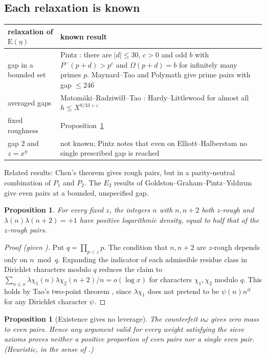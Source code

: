 \documentclass[11pt]{amsart}
\newtheorem{proposition}[theorem]{Proposition}
\theoremstyle{definition}
\theoremstyle{remark}
\newcommand{\EE}{\mathrm E}
\begin{document}
\subsection{Each relaxation is known}
\begin{table}[h]
\centering\small
\begin{tabular}{p{4.2cm}p{8.6cm}}
\toprule
relaxation of $\EE(\eta)$ & known result\\
\midrule
gap in a bounded set & Pintz \cite[Thm.~2]{Pin10}: there are $|d|\le30$, $c>0$ and odd $b$ with $P^-(p+d)>p^c$ and $\Omega(p+d)=b$ for infinitely many primes $p$. Maynard--Tao and Polymath \cite{Polymath8b} give prime pairs with gap $\le246$\\
averaged gaps & Matom\"aki--Radziwi\l{}\l{}--Tao \cite{MRT19}: Hardy--Littlewood for almost all $h\le X^{8/33+\varepsilon}$\\
fixed roughness & Proposition~\ref{prop:fixedz}\\
gap $2$ and $z=x^\eta$ & not known; Pintz notes that even on Elliott--Halberstam no single prescribed gap is reached \cite[p.~3]{Pin10}\\
\bottomrule
\end{tabular}
\end{table}

Related results: Chen's theorem \cite{Che73} gives rough pairs, but in a parity-neutral combination of $P_1$ and $P_2$. The $E_2$ results of Goldston--Graham--Pintz--Y{\i}ld{\i}r{\i}m \cite{GGPY06} give even pairs at a bounded, unspecified gap.

\begin{proposition}\label{prop:fixedz}
For every fixed $z$, the integers $n$ with $n,n+2$ both $z$-rough and $\lambda(n)\lambda(n+2)=+1$ have positive logarithmic density, equal to half that of the $z$-rough pairs.
\end{proposition}
\begin{proof}[Proof (given \cite{Tao16})]
Put $q=\prod_{p<z}p$. The condition that $n,n+2$ are $z$-rough depends only on $n\bmod q$. Expanding the indicator of each admissible residue class in Dirichlet characters modulo $q$ reduces the claim to $\sum_{n\le x}\lambda\chi_1(n)\lambda\chi_2(n+2)/n=o(\log x)$ for characters $\chi_1,\chi_2$ modulo $q$. This holds by Tao's two-point theorem \cite{Tao16}, since $\lambda\chi_1$ does not pretend to be $\psi(n)n^{it}$ for any Dirichlet character $\psi$.
\end{proof}

\begin{proposition}[Existence gives no leverage]\label{prop:noleverage}
The counterfeit $\nu\omega$ gives \emph{zero} mass to even pairs. Hence any argument valid for every weight satisfying the sieve axioms proves neither a positive proportion of even pairs nor a single even pair. (Heuristic, in the sense of \cite[\S8]{Polymath8b}.)
\end{proposition}
\end{document}
